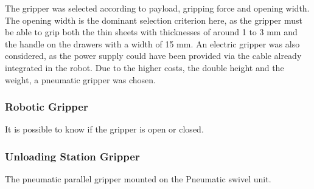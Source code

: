 The gripper was selected according to payload, gripping force and opening width. The
opening width is the dominant selection criterion here, as the gripper must be able to grip both the thin
sheets with thicknesses of around 1 to 3 mm and the handle on the drawers with a width of 15 mm. An
electric gripper was also considered, as the power supply could have been provided via the cable
already integrated in the robot. Due to the higher costs, the double height and the weight, a pneumatic
gripper was chosen.

\subsubsection{Robotic Gripper}
\label{subsubsec:robotic-gripper}
It is possible to know if the gripper is open or closed.

\subsubsection{Unloading Station Gripper}
\label{subsubsec:unloading-gripper}
The pneumatic parallel gripper mounted on the Pneumatic swivel unit.
